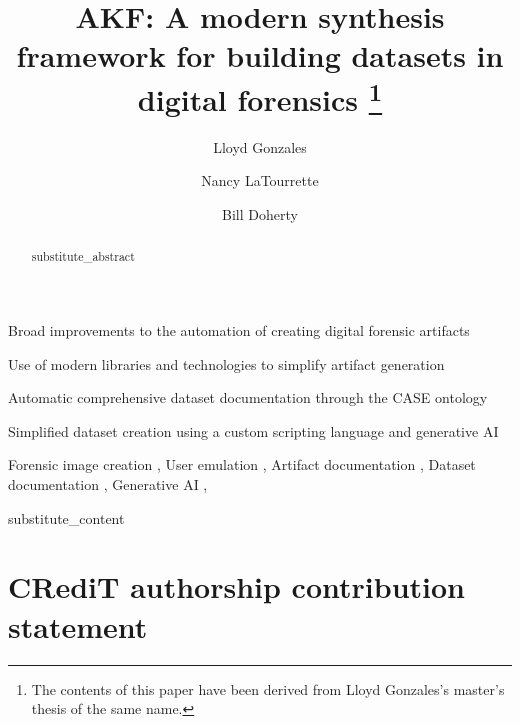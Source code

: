 \documentclass[final,5p,times,twocolumn]{elsarticle}
\begin{document}
\begin{frontmatter}

\title{AKF: A modern synthesis framework for building datasets in digital forensics
    \footnote{The contents of this paper have been derived from Lloyd Gonzales's master's thesis of the same name.}
}

\author[unr]{Lloyd Gonzales}
\author[unr]{Nancy LaTourrette}
\author[unr]{Bill Doherty}

\begin{abstract}
{{substitute_abstract}}
\end{abstract}


\begin{highlights}
\item Broad improvements to the automation of creating digital forensic artifacts
\item Use of modern libraries and technologies to simplify artifact generation
\item Automatic comprehensive dataset documentation through the CASE ontology
\item Simplified dataset creation using a custom scripting language and generative AI
\end{highlights}
    
\begin{keyword}
Forensic image creation \sep
User emulation \sep
Artifact documentation \sep
Dataset documentation \sep
Generative AI \sep
\end{keyword}

\end{frontmatter}

{{substitute_content}}


\section*{CRediT authorship contribution statement}
\end{document}
